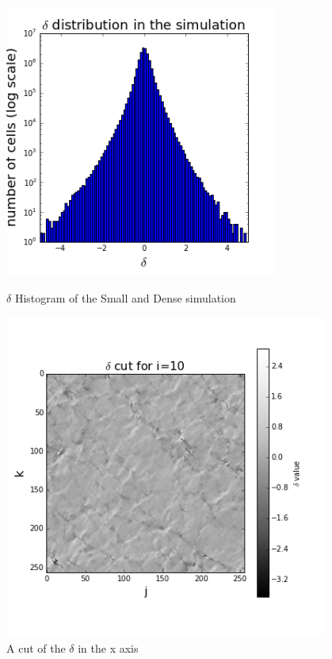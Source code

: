 \documentclass[12pt]{article}
\begin{document}
\begin{figure}[ht]
\centering
\begin{minipage}{.5\textwidth}
  \centering
  \includegraphics[width=0.8\textwidth]{simulation/Trace_hist_sim.png} %
\caption{$\delta$ Histogram of the Small and Dense simulation}
\label{fg:hist_Trace}
\end{minipage}%
\begin{minipage}{.5\textwidth}
  \centering
  \includegraphics[width=0.95\textwidth]{simulation/Trace_cut_i_10.png}
  \caption{A cut of the $\delta$ in the x axis}
\label{fg:cut_Trace}
\end{minipage}
\end{figure}
\FloatBarrier
\end{document}

